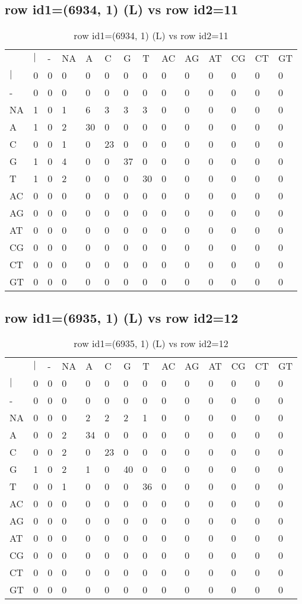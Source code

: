 \subsection{row id1=(6934, 1) (L) vs row id2=11}
\begin{center}
\begin{longtable}{|l|l|l|l|l|l|l|l|l|l|l|l|l|l|}
\caption{row id1=(6934, 1) (L) vs row id2=11} \label{table_dm130}\\
\hline
\\
\hline
&$|$&-&NA&A&C&G&T&AC&AG&AT&CG&CT&GT\\
$|$&0&0&0&0&0&0&0&0&0&0&0&0&0\\
-&0&0&0&0&0&0&0&0&0&0&0&0&0\\
NA&1&0&1&6&3&3&3&0&0&0&0&0&0\\
A&1&0&2&30&0&0&0&0&0&0&0&0&0\\
C&0&0&1&0&23&0&0&0&0&0&0&0&0\\
G&1&0&4&0&0&37&0&0&0&0&0&0&0\\
T&1&0&2&0&0&0&30&0&0&0&0&0&0\\
AC&0&0&0&0&0&0&0&0&0&0&0&0&0\\
AG&0&0&0&0&0&0&0&0&0&0&0&0&0\\
AT&0&0&0&0&0&0&0&0&0&0&0&0&0\\
CG&0&0&0&0&0&0&0&0&0&0&0&0&0\\
CT&0&0&0&0&0&0&0&0&0&0&0&0&0\\
GT&0&0&0&0&0&0&0&0&0&0&0&0&0\\
\hline
\end{longtable}
\end{center}

\subsection{row id1=(6935, 1) (L) vs row id2=12}
\begin{center}
\begin{longtable}{|l|l|l|l|l|l|l|l|l|l|l|l|l|l|}
\caption{row id1=(6935, 1) (L) vs row id2=12} \label{table_dm132}\\
\hline
\\
\hline
&$|$&-&NA&A&C&G&T&AC&AG&AT&CG&CT&GT\\
$|$&0&0&0&0&0&0&0&0&0&0&0&0&0\\
-&0&0&0&0&0&0&0&0&0&0&0&0&0\\
NA&0&0&0&2&2&2&1&0&0&0&0&0&0\\
A&0&0&2&34&0&0&0&0&0&0&0&0&0\\
C&0&0&2&0&23&0&0&0&0&0&0&0&0\\
G&1&0&2&1&0&40&0&0&0&0&0&0&0\\
T&0&0&1&0&0&0&36&0&0&0&0&0&0\\
AC&0&0&0&0&0&0&0&0&0&0&0&0&0\\
AG&0&0&0&0&0&0&0&0&0&0&0&0&0\\
AT&0&0&0&0&0&0&0&0&0&0&0&0&0\\
CG&0&0&0&0&0&0&0&0&0&0&0&0&0\\
CT&0&0&0&0&0&0&0&0&0&0&0&0&0\\
GT&0&0&0&0&0&0&0&0&0&0&0&0&0\\
\hline
\end{longtable}
\end{center}

